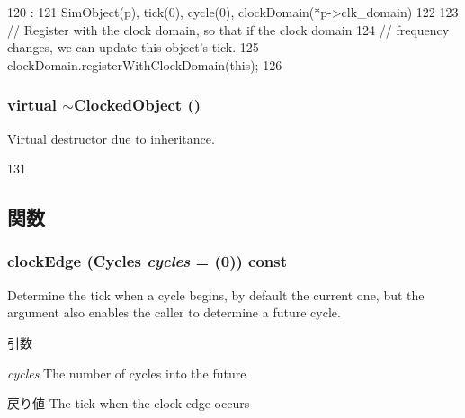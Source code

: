 \begin{DoxyCode}
120                                                 :
121         SimObject(p), tick(0), cycle(0), clockDomain(*p->clk_domain)
122     {
123         // Register with the clock domain, so that if the clock domain
124         // frequency changes, we can update this object's tick.
125         clockDomain.registerWithClockDomain(this);
126     }

\end{DoxyCode}
\hypertarget{classClockedObject_a2f1ff92cfe792a99c7d65f11bccb3d79}{
\subsubsection[{$\sim$ClockedObject}]{\setlength{\rightskip}{0pt plus 5cm}virtual $\sim${\bf ClockedObject} ()}}
\label{classClockedObject_a2f1ff92cfe792a99c7d65f11bccb3d79}
Virtual destructor due to inheritance. 


\begin{DoxyCode}
131 { }
\end{DoxyCode}


\subsection{関数}
\hypertarget{classClockedObject_a773956693f216cafb7d4cad92ad582e5}{
\subsubsection[{clockEdge}]{ clockEdge ({\bf Cycles} {\em cycles} = {(0)}) const}}
\label{classClockedObject_a773956693f216cafb7d4cad92ad582e5}
Determine the tick when a cycle begins, by default the current one, but the argument also enables the caller to determine a future cycle.


\begin{DoxyParams}{引数}
\item[{\em cycles}]The number of cycles into the future\end{DoxyParams}
\begin{DoxyReturn}{戻り値}
The tick when the clock edge occurs 
\end{DoxyReturn}



